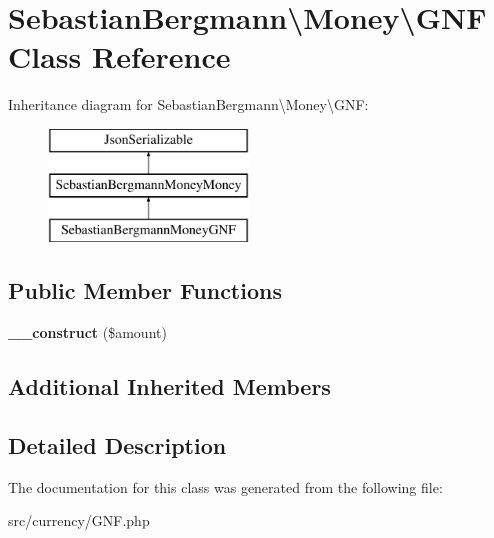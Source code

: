 \hypertarget{classSebastianBergmann_1_1Money_1_1GNF}{}\section{Sebastian\+Bergmann\textbackslash{}Money\textbackslash{}G\+N\+F Class Reference}
\label{classSebastianBergmann_1_1Money_1_1GNF}
Inheritance diagram for Sebastian\+Bergmann\textbackslash{}Money\textbackslash{}G\+N\+F\+:\begin{figure}[H]
\begin{center}
\leavevmode
\includegraphics[height=3.000000cm]{classSebastianBergmann_1_1Money_1_1GNF}
\end{center}
\end{figure}
\subsection*{Public Member Functions}
\begin{DoxyCompactItemize}
\item 
\hypertarget{classSebastianBergmann_1_1Money_1_1GNF_ae194f764524302ccd050ba244c0336cb}{}{\bfseries \+\_\+\+\_\+construct} (\$amount)\label{classSebastianBergmann_1_1Money_1_1GNF_ae194f764524302ccd050ba244c0336cb}

\end{DoxyCompactItemize}
\subsection*{Additional Inherited Members}


\subsection{Detailed Description}


The documentation for this class was generated from the following file\+:\begin{DoxyCompactItemize}
\item 
src/currency/G\+N\+F.\+php\end{DoxyCompactItemize}
